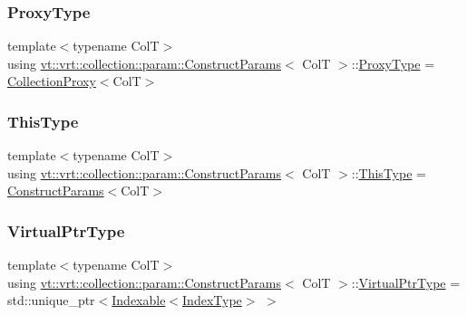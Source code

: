 \subsubsection{\texorpdfstring{Proxy\+Type}{ProxyType}}
{\footnotesize\ttfamily template$<$typename ColT$>$ \\
using \hyperlink{structvt_1_1vrt_1_1collection_1_1param_1_1_construct_params}{vt\+::vrt\+::collection\+::param\+::\+Construct\+Params}$<$ ColT $>$\+::\hyperlink{structvt_1_1vrt_1_1collection_1_1param_1_1_construct_params_a837fb2b2a036f898fb65da72d3ee2fb0}{Proxy\+Type} =  \hyperlink{structvt_1_1vrt_1_1collection_1_1_collection_proxy}{Collection\+Proxy}$<$ColT$>$}

\mbox{\label{structvt_1_1vrt_1_1collection_1_1param_1_1_construct_params_a13d4910c0f6825c7b0ddfebce5288bea}} 
\subsubsection{\texorpdfstring{This\+Type}{ThisType}}
{\footnotesize\ttfamily template$<$typename ColT$>$ \\
using \hyperlink{structvt_1_1vrt_1_1collection_1_1param_1_1_construct_params}{vt\+::vrt\+::collection\+::param\+::\+Construct\+Params}$<$ ColT $>$\+::\hyperlink{structvt_1_1vrt_1_1collection_1_1param_1_1_construct_params_a13d4910c0f6825c7b0ddfebce5288bea}{This\+Type} =  \hyperlink{structvt_1_1vrt_1_1collection_1_1param_1_1_construct_params}{Construct\+Params}$<$ColT$>$}

\mbox{\label{structvt_1_1vrt_1_1collection_1_1param_1_1_construct_params_ac3715f51f35c3ce6357ef3e9547beb73}} 
\subsubsection{\texorpdfstring{Virtual\+Ptr\+Type}{VirtualPtrType}}
{\footnotesize\ttfamily template$<$typename ColT$>$ \\
using \hyperlink{structvt_1_1vrt_1_1collection_1_1param_1_1_construct_params}{vt\+::vrt\+::collection\+::param\+::\+Construct\+Params}$<$ ColT $>$\+::\hyperlink{structvt_1_1vrt_1_1collection_1_1param_1_1_construct_params_ac3715f51f35c3ce6357ef3e9547beb73}{Virtual\+Ptr\+Type} =  std\+::unique\+\_\+ptr$<$\hyperlink{structvt_1_1vrt_1_1collection_1_1_indexable}{Indexable}$<$\hyperlink{structvt_1_1vrt_1_1collection_1_1param_1_1_construct_params_a7bc8d5d57e377e0f2e60031582eeb7e6}{Index\+Type}$>$ $>$}




